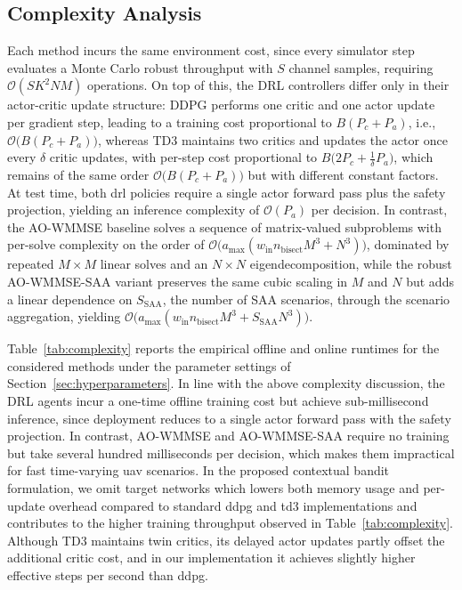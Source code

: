 \subsection{Complexity Analysis}
\label{ssec:complexity_analysis}

Each method incurs the same environment cost, since every simulator step evaluates a Monte Carlo robust throughput with $S$ channel samples, requiring $\mathcal{O}(S K^2 N M)$ operations. On top of this, the DRL controllers differ only in their actor-critic update structure: DDPG performs one critic and one actor update per gradient step, leading to a training cost proportional to $B(P_c + P_a)$, i.e., $\mathcal{O}\big(B(P_c + P_a)\big)$, whereas TD3 maintains two critics and updates the actor once every $\delta$ critic updates, with per-step cost proportional to $B\big(2P_c + \tfrac{1}{\delta} P_a\big)$, which remains of the same order $\mathcal{O}\big(B(P_c + P_a)\big)$ but with different constant factors. At test time, both \gls{drl} policies require a single actor forward pass plus the safety projection, yielding an inference complexity of $\mathcal{O}(P_a)$ per decision. In contrast, the AO-WMMSE baseline solves a sequence of matrix-valued subproblems with per-solve complexity on the order of $\mathcal{O}\big(a_{\max}(w_{\mathrm{in}} n_{\mathrm{bisect}} M^3 + N^3)\big)$, dominated by repeated $M \times M$ linear solves and an $N \times N$ eigendecomposition, while the robust AO-WMMSE-SAA variant preserves the same cubic scaling in $M$ and $N$ but adds a linear dependence on $S_{\mathrm{SAA}}$, the number of SAA scenarios, through the scenario aggregation, yielding $\mathcal{O}\big(a_{\max}(w_{\mathrm{in}} n_{\mathrm{bisect}} M^3 + S_{\mathrm{SAA}} N^3)\big)$.


Table~\ref{tab:complexity} reports the empirical offline and online runtimes for the considered methods under the parameter settings of Section~\ref{sec:hyperparameters}. In line with the above complexity discussion, the DRL agents incur a one-time offline training cost but achieve sub-millisecond inference, since deployment reduces to a single actor forward pass with the safety projection. In contrast, AO-WMMSE and AO-WMMSE-SAA require no training but take several hundred milliseconds per decision, which makes them impractical for fast time-varying \gls{uav} scenarios. In the proposed contextual bandit formulation, we omit target networks which lowers both memory usage and per-update overhead compared to standard \gls{ddpg} and \gls{td3} implementations and contributes to the higher training throughput observed in Table~\ref{tab:complexity}. Although TD3 maintains twin critics, its delayed actor updates partly offset the additional critic cost, and in our implementation it achieves slightly higher effective steps per second than \gls{ddpg}.

